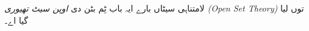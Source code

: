 \documentclass[../../../include/open-logic-chapter]{subfiles}
\begin{document}

\begin{editorial}
لامتناہی سیٹاں بارے ایہ باب ٹِم بٹن دی \emph{اوپن سیٹ تھیوری
(Open Set Theory)} توں لیا گیا اے۔
\end{editorial}

\end{document}
